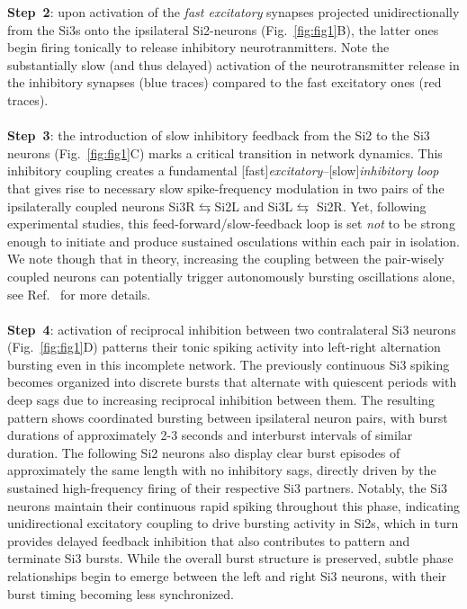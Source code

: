 \documentclass[nofootinbib,aip,amsmath,amssymb,reprint,twocolumn,10pt]{revtex4-2}
\begin{document}
%
{\bf Step~2}: upon activation of the {\em fast excitatory} synapses projected unidirectionally from the Si3s onto the ipsilateral Si2-neurons (Fig.~\ref{fig:fig1}B), the latter ones begin firing tonically to release inhibitory neurotranmitters. Note the substantially slow (and thus delayed) activation of the neurotransmitter release in the inhibitory synapses (blue traces) compared to the fast excitatory ones (red traces). \\  ~\\
{\bf Step~3}: the introduction of slow inhibitory feedback from the Si2 to the Si3 neurons (Fig.~\ref{fig:fig1}C) marks a critical transition in network dynamics. This inhibitory coupling creates a fundamental  [fast]{\em excitatory}--[slow]{\em inhibitory loop} that gives rise to necessary slow spike-frequency modulation in two pairs of the ipsilaterally coupled neurons Si3R$\leftrightarrows$Si2L and Si3L$\leftrightarrows$ Si2R. Yet, following experimental studies, this feed-forward/slow-feedback loop is set {\em not} to be strong enough to initiate and produce sustained osculations within each pair in isolation. We note though that in theory, increasing the coupling between the pair-wisely coupled neurons can potentially trigger autonomously bursting oscillations alone, see Ref.~\cite{scully2024pairing} for more details. \\ ~\\
{\bf Step~4}: activation of reciprocal inhibition between two contralateral Si3 neurons (Fig.~\ref{fig:fig1}D) patterns their tonic spiking activity into left-right alternation bursting even in this incomplete network. The previously continuous Si3 spiking becomes organized into discrete bursts that alternate with quiescent periods with  deep sags due to increasing reciprocal inhibition between them. The resulting pattern shows coordinated bursting between ipsilateral neuron pairs, with burst durations of approximately 2-3 seconds and interburst intervals of similar duration. The following Si2 neurons also display clear burst episodes of approximately the same length with no inhibitory sags, directly driven by the sustained high-frequency firing of their respective Si3 partners. Notably, the Si3 neurons maintain their continuous rapid spiking throughout this phase, indicating unidirectional excitatory coupling to drive bursting activity in  Si2s, which in turn provides delayed feedback inhibition that also contributes to pattern and terminate Si3 bursts.  While the overall burst structure is preserved, subtle phase relationships begin to emerge between the left and right Si3 neurons, with their burst timing becoming less synchronized. \\~\\
\end{document}
